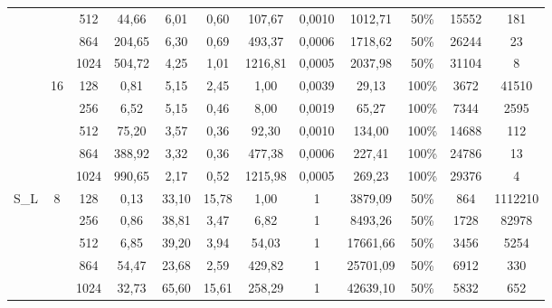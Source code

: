 \documentclass[10pt,a4paper]{article}
\begin{document}
\begin{center}
\begin{tabular}{ |c|c|c|c|c|c|c|c|c|c|c|c| }
		                        &                     & 512  & 44,66  & 6,01   & 0,60   & 107,67     & 0,0010 & 1012,71  & 50\%  & 15552    & 181     \\ \cline{3-12}
		                        &                     & 864  & 204,65 & 6,30   & 0,69   & 493,37     & 0,0006 & 1718,62  & 50\%  & 26244    & 23      \\ \cline{3-12}
		                        &                     & 1024 & 504,72 & 4,25   & 1,01   & 1216,81    & 0,0005 & 2037,98  & 50\%  & 31104    & 8       \\ \cline{2-12}
		                        & \multirow{5}{*}{16} & 128  & 0,81   & 5,15   & 2,45   & 1,00       & 0,0039 & 29,13    & 100\% & 3672     & 41510   \\ \cline{3-12}
		                        &                     & 256  & 6,52   & 5,15   & 0,46   & 8,00       & 0,0019 & 65,27    & 100\% & 7344     & 2595    \\ \cline{3-12}
		                        &                     & 512  & 75,20  & 3,57   & 0,36   & 92,30      & 0,0010 & 134,00   & 100\% & 14688    & 112     \\ \cline{3-12}
		                        &                     & 864  & 388,92 & 3,32   & 0,36   & 477,38     & 0,0006 & 227,41   & 100\% & 24786    & 13      \\ \cline{3-12}
		                        &                     & 1024 & 990,65 & 2,17   & 0,52   & 1215,98    & 0,0005 & 269,23   & 100\% & 29376    & 4       \\ \cline{1-12}
		\multirow{10}{*}{S\_L}  & \multirow{5}{*}{8}  & 128  & 0,13   & 33,10  & 15,78  & 1,00       & 1      & 3879,09  & 50\%  & 864      & 1112210 \\ \cline{3-12}
		                        &                     & 256  & 0,86   & 38,81  & 3,47   & 6,82       & 1      & 8493,26  & 50\%  & 1728     & 82978   \\ \cline{3-12}
		                        &                     & 512  & 6,85   & 39,20  & 3,94   & 54,03      & 1      & 17661,66 & 50\%  & 3456     & 5254    \\ \cline{3-12}
		                        &                     & 864  & 54,47  & 23,68  & 2,59   & 429,82     & 1      & 25701,09 & 50\%  & 6912     & 330     \\ \cline{3-12}
		                        &                     & 1024 & 32,73  & 65,60  & 15,61  & 258,29     & 1      & 42639,10 & 50\%  & 5832     & 652     \\ \cline{2-12}

\end{tabular}
\end{center}
\end{document}
